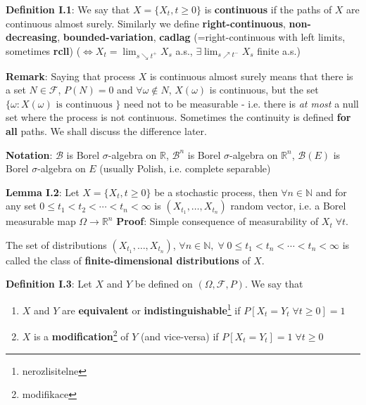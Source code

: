 \documentclass[english]{article}
\newcommand{\R}{\mathbb{R}}
\newcommand{\N}{\mathbb{N}}
\newcommand{\note}[1]{\noindent\textbf{#1}}
\newcommand{\F}{\mathcal F}
\newcommand{\B}{\mathcal B}
\begin{document}
\note{Definition I.1}: We say that $X = \{X_t, t\geq 0\}$ is \textbf{continuous} if the paths of $X$ are continuous almost surely.
Similarly we define \textbf{right-continuous}, \textbf{non-decreasing}, \textbf{bounded-variation}, \textbf{cadlag} (=right-continuous with left limits, sometimes \textbf{rcll}) ($\iff X_t = \lim_{s \searrow t^+} X_s$ a.s., $\exists \lim_{s\nearrow t^-} X_s$ finite a.s.)\newline

\note{Remark}: Saying that process $X$ is continuous almost surely means that there is a set $N\in \F$, $P(N) = 0$ and $\forall \omega \notin N$, $X(\omega)$ is continuous, but the set $\{\omega: X(\omega) \text{ is continuous }\}$ need not to be measurable - i.e. there is \textit{at most} a null set where the process is not continuous.\newline
Sometimes the continuity is defined \textbf{for all} paths. We shall discuss the difference later.\newline

\note{Notation}: $\B$ is Borel $\sigma$-algebra on $\R$, $\B^n$ is Borel $\sigma$-algebra on $\R^n$, $\B(E)$ is Borel $\sigma$-algebra on $E$ (usually Polish, i.e. complete separable) \newline

\note{Lemma I.2}: Let $X = \{X_t, t\geq 0\}$ be a stochastic process, then $\forall n\in \N$ and for any set $0\leq t_1 < t_2 < \cdots < t_n < \infty$ is $(X_{t_1}, \dots, X_{t_n})$ random vector, i.e. a Borel measurable map $\Omega \to \R^n$\newline
\textbf{Proof}: Simple consequence of measurability of $X_t\;\forall t$.\newline

\noindent The set of distributions $(X_{t_1}, \dots, X_{t_n})$, $\forall n\in \N,\; \forall\; 0\leq t_1 < t_n < \cdots < t_n < \infty$ is called the class of \textbf{finite-dimensional distributions} of $X$. \newline

\pagebreak \note{Definition I.3}: Let $X$ and $Y$ be defined on $(\Omega, \F, P)$. We say that \begin{enumerate}
\item $X$ and $Y$ are \textbf{equivalent} or \textbf{indistinguishable}\footnote{nerozlisitelne}  if $P[X_t = Y_t \;\forall t\geq 0] = 1$
\item $X$ is a \textbf{modification}\footnote{modifikace} of $Y$ (and vice-versa) if $P[X_t = Y_t] = 1 \;\forall t\geq 0$ 
\end{enumerate}
\end{document}
